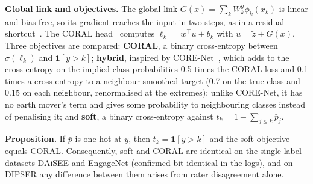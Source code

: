 \textbf{Global link and objectives.} The global link $G(x)=\sum_kW^{g}_k\phi_k(x_k)$ is linear and bias-free, so its gradient reaches the input in two steps, as in a residual shortcut~\cite{he2016deep}. The CORAL head~\cite{cao2020coral} computes $\ell_k=w^\top u+b_k$ with $u=\tilde z+G(x)$. Three objectives are compared: \textbf{CORAL}, a binary cross-entropy between $\sigma(\ell_k)$ and $\mathbf{1}[y>k]$; \textbf{hybrid}, inspired by CORE-Net~\cite{tran2026ordinal}, which adds to the cross-entropy on the implied class probabilities 0.5 times the CORAL loss and 0.1 times a cross-entropy to a neighbour-smoothed target (0.7 on the true class and 0.15 on each neighbour, renormalised at the extremes); unlike CORE-Net, it has no earth mover's term and gives some probability to neighbouring classes instead of penalising it; and \textbf{soft}, a binary cross-entropy against $t_k=1-\sum_{j\le k}\bar p_j$.

\noindent\textbf{Proposition.} If $\bar p$ is one-hot at $y$, then $t_k=\mathbf{1}[y>k]$ and the soft objective equals CORAL. Consequently, soft and CORAL are identical on the single-label datasets DAiSEE and EngageNet (confirmed bit-identical in the logs), and on DIPSER any difference between them arises from rater disagreement alone.
